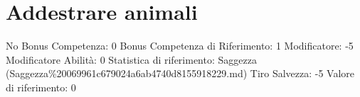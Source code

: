 \section{Addestrare animali}\label{addestrare-animali}

\begin{description}
\tightlist
\item[Tags: ABI]
No Bonus Competenza: 0 Bonus Competenza di Riferimento: 1 Modificatore:
-5 Modificatore Abilità: 0 Statistica di riferimento: Saggezza
(Saggezza\%20069961c679024a6ab4740d8155918229.md) Tiro Salvezza: -5
Valore di riferimento: 0
\end{description}
